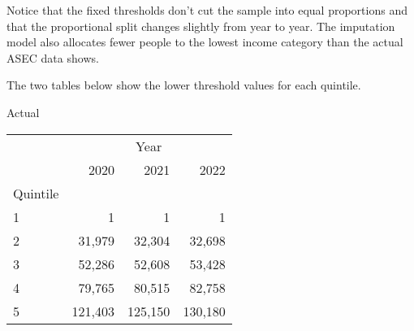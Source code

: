\documentclass{article}
\begin{document}
	Notice that the fixed thresholds don't cut the sample into equal proportions and that the proportional split changes slightly from year to year. The imputation model also allocates fewer people to the lowest income category than the actual ASEC data shows. 
	
	The two tables below show the lower threshold values for each quintile.
	
	\begin{minipage}[b]{.40\textwidth}
		\centering
		Actual
		\centering
		\begin{tabular}{llll}
			\cline{1-4}
			\multicolumn{1}{c}{} &
			\multicolumn{3}{|c}{Year} \\
			\multicolumn{1}{c}{} &
			\multicolumn{1}{|r}{2020} &
			\multicolumn{1}{r}{2021} &
			\multicolumn{1}{r}{2022} \\
			\cline{1-4}
			\multicolumn{1}{l}{Quintile} &
			\multicolumn{1}{|r}{} &
			\multicolumn{1}{r}{} &
			\multicolumn{1}{r}{} \\
			\multicolumn{1}{l}{\hspace{1em}1} &
			\multicolumn{1}{|r}{1} &
			\multicolumn{1}{r}{1} &
			\multicolumn{1}{r}{1} \\
			\multicolumn{1}{l}{\hspace{1em}2} &
			\multicolumn{1}{|r}{31,979} &
			\multicolumn{1}{r}{32,304} &
			\multicolumn{1}{r}{32,698} \\
			\multicolumn{1}{l}{\hspace{1em}3} &
			\multicolumn{1}{|r}{52,286} &
			\multicolumn{1}{r}{52,608} &
			\multicolumn{1}{r}{53,428} \\
			\multicolumn{1}{l}{\hspace{1em}4} &
			\multicolumn{1}{|r}{79,765} &
			\multicolumn{1}{r}{80,515} &
			\multicolumn{1}{r}{82,758} \\
			\multicolumn{1}{l}{\hspace{1em}5} &
			\multicolumn{1}{|r}{121,403} &
			\multicolumn{1}{r}{125,150} &
			\multicolumn{1}{r}{130,180} \\
			\cline{1-4}
		\end{tabular}
	\end{minipage}\qquad
\end{document}

